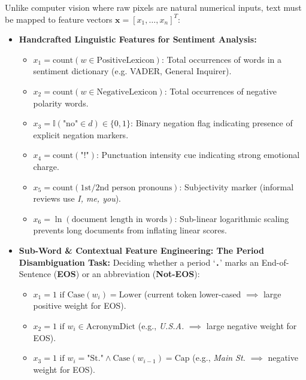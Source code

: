 \documentclass[10pt,a4paper]{article}
\newcommand{\rx}[1]{\texttt{\bfseries\color{inlinecode}#1}}
\begin{document}
\par\vspace{1pt}
Unlike computer vision where raw pixels are natural numerical inputs, text must be mapped to feature vectors $\mathbf{x} = [x_1, \dots, x_n]^T$:
\begin{itemize}[leftmargin=12pt, itemsep=0.5pt, parsep=0pt, topsep=0.5pt]
    \item \textbf{Handcrafted Linguistic Features for Sentiment Analysis:}
    \begin{itemize}[leftmargin=12pt, itemsep=0.5pt, parsep=0pt]
        \item $x_1 = \text{count}(w \in \text{PositiveLexicon})$: Total occurrences of words in a sentiment dictionary (e.g. VADER, General Inquirer).
        \item $x_2 = \text{count}(w \in \text{NegativeLexicon})$: Total occurrences of negative polarity words.
        \item $x_3 = \mathbb{I}(\text{"no"} \in d) \in \{0, 1\}$: Binary negation flag indicating presence of explicit negation markers.
        \item $x_4 = \text{count}(\text{"!"})$: Punctuation intensity cue indicating strong emotional charge.
        \item $x_5 = \text{count}(\text{1st/2nd person pronouns})$: Subjectivity marker (informal reviews use \textit{I, me, you}).
        \item $x_6 = \ln(\text{document length in words})$: Sub-linear logarithmic scaling prevents long documents from inflating linear scores.
    \end{itemize}
    \item \textbf{Sub-Word \& Contextual Feature Engineering: The Period Disambiguation Task:}
    Deciding whether a period `\rx{.}' marks an End-of-Sentence (\textbf{EOS}) or an abbreviation (\textbf{Not-EOS}):
    \begin{itemize}[leftmargin=12pt, itemsep=0.5pt, parsep=0pt]
        \item $x_1 = 1 \text{ if } \text{Case}(w_i) = \text{Lower}$ (current token lower-cased $\implies$ large positive weight for EOS).
        \item $x_2 = 1 \text{ if } w_i \in \text{AcronymDict}$ (e.g., \textit{U.S.A.} $\implies$ large negative weight for EOS).
        \item $x_3 = 1 \text{ if } w_i = \text{"St."} \land \text{Case}(w_{i-1}) = \text{Cap}$ (e.g., \textit{Main St.} $\implies$ negative weight for EOS).
    \end{itemize}
\end{itemize}
\vspace{2pt}
\end{document}
